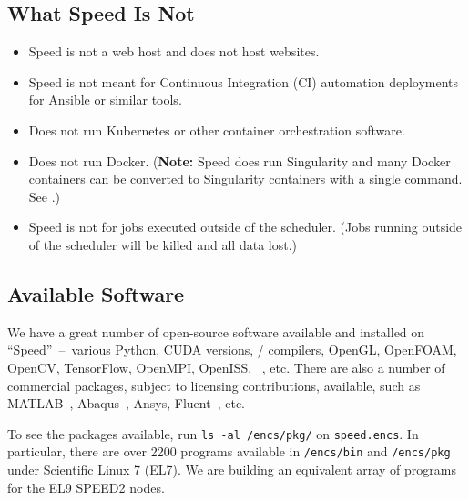 \documentclass{easychair}
\begin{document}
\subsection{What Speed Is Not}
\label{sect:speed-is-not}

\begin{itemize}
\item Speed is not a web host and does not host websites.
\item Speed is not meant for Continuous Integration (CI) automation deployments for Ansible or similar tools. 
\item Does not run Kubernetes or other container orchestration software.
\item Does not run Docker. (\textbf{Note:} Speed does run Singularity and many Docker containers can be converted to Singularity containers with a single command. See .)
\item Speed is not for jobs executed outside of the scheduler. (Jobs running outside of the scheduler will be killed and all data lost.)
\end{itemize}

\subsection{Available Software}

We have a great number of open-source software available and installed
on ``Speed''~--~various Python, CUDA versions, {\cpp}/{\java} compilers, OpenGL,
OpenFOAM, OpenCV, TensorFlow, OpenMPI, OpenISS, {\marf}~\cite{marf}, etc.
There are also a number of commercial packages, subject to licensing
contributions, available, such as MATLAB~\cite{matlab,scholarpedia-matlab}, Abaqus~\cite{abaqus}, 
Ansys, Fluent~\cite{fluent}, etc. 

To see the packages available, run \texttt{ls -al /encs/pkg/} on \texttt{speed.encs}.
%
In particular, there are over 2200 programs available in
\texttt{/encs/bin} and \texttt{/encs/pkg} under Scientific Linux 7 (EL7).
We are building an equivalent array of programs for the EL9 SPEED2 nodes.
\end{document}
